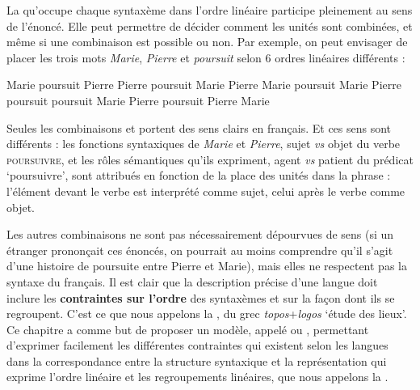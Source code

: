 La  qu’occupe chaque syntaxème dans l’ordre linéaire participe pleinement au sens de l’énoncé. Elle peut permettre de décider comment les unités sont combinées, et même si une combinaison est possible ou non. Par exemple, on peut envisager de placer les trois mots \textit{Marie}, \textit{Pierre} et \textit{poursuit} selon 6 ordres linéaires différents :

\ea
\ea Marie poursuit Pierre
\ex Pierre poursuit Marie
\ex Pierre Marie poursuit
\ex Marie Pierre poursuit
\ex poursuit Marie Pierre
\ex poursuit Pierre Marie
\z
\z

Seules les combinaisons  et  portent des sens clairs en français. Et ces sens sont différents : les fonctions syntaxiques de \textit{Marie} et \textit{Pierre}, sujet \textit{vs} objet du verbe \textsc{poursuivre}, et les rôles sémantiques qu’ils expriment, agent \textit{vs} patient du prédicat ‘poursuivre’, sont attribués en fonction de la place des unités dans la phrase : l’élément devant le verbe est interprété comme sujet, celui après le verbe comme objet.

Les autres combinaisons ne sont pas nécessairement dépourvues de sens (si un étranger prononçait ces énoncés, on pourrait au moins comprendre qu’il s’agit d’une histoire de poursuite entre Pierre et Marie), mais elles ne respectent pas la syntaxe du français. Il est clair que la description précise d’une langue doit inclure les \textbf{contraintes sur l’ordre} des syntaxèmes et sur la façon dont ils se regroupent. C’est ce que nous appelons la , du grec \textit{topos}+\textit{logos} ‘étude des lieux’. Ce chapitre a comme but de proposer un modèle, appelé  ou , permettant d’exprimer facilement les différentes contraintes qui existent selon les langues dans la correspondance entre la structure syntaxique et la représentation qui exprime l’ordre linéaire et les regroupements linéaires, que nous appelons la .

